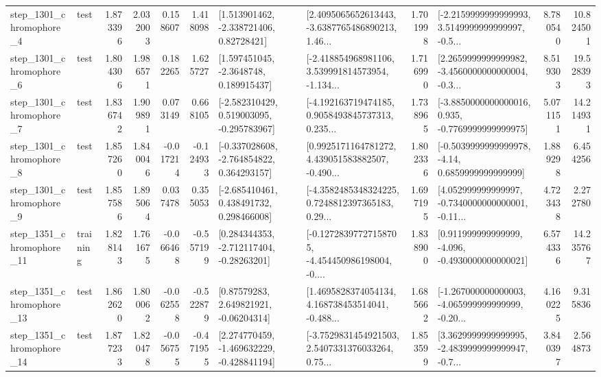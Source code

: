 \begin{tabular}{llrrrrllrlrr}
  step\_1301\_chromophore\_4 &      test &      1.873396 &    2.032003 &      0.158607 &  1.418098 &     [1.513901462, -2.338721406, 0.82728421] &  [2.4095065652613443, -3.6387765486890213, 1.46... &       1.701998 &  [-2.2159999999999993, 3.5149999999999997, -0.5... &            8.780540 &         10.824501 \\
  step\_1301\_chromophore\_6 &      test &      1.804306 &    1.986571 &      0.182265 &  1.625727 &      [1.597451045, -2.3648748, 0.189915437] &  [-2.418854968981106, 3.539991814573954, -1.134... &       1.716990 &  [2.2659999999999982, -3.4560000000000004, -0.3... &            8.519303 &         19.528393 \\
  step\_1301\_chromophore\_7 &      test &      1.836742 &    1.909891 &      0.073149 &  0.668105 &   [-2.582310429, 0.519003095, -0.295783967] &  [-4.192163719474185, 0.9058493845737313, 0.235... &       1.738965 &  [-3.8850000000000016, 0.935, -0.7769999999999975] &            5.071151 &         14.214931 \\
  step\_1301\_chromophore\_8 &      test &      1.857260 &    1.840046 &     -0.017214 & -0.124933 &   [-0.337028608, -2.764854822, 0.364293157] &  [0.9925171164781272, 4.439051583882507, -0.490... &       1.802336 &   [-0.5039999999999978, -4.14, 0.6859999999999999] &            1.889298 &          6.454256 \\
  step\_1301\_chromophore\_9 &      test &      1.857586 &    1.895064 &      0.037478 &  0.355053 &    [-2.685410461, 0.438491732, 0.298466008] &  [-4.3582485348324225, 0.7248812397365183, 0.29... &       1.697195 &  [4.052999999999997, -0.7340000000000001, -0.11... &            4.723438 &          2.272780 \\
 step\_1351\_chromophore\_11 &  training &      1.828143 &    1.761675 &     -0.066468 & -0.557199 &    [0.284344353, -2.712117404, -0.28263201] &  [-0.12728397727158705, -4.454450986198004, -0.... &       1.838900 &   [0.911999999999999, -4.096, -0.4930000000000021] &            6.574336 &         14.235767 \\
 step\_1351\_chromophore\_13 &      test &      1.862620 &    1.800062 &     -0.062558 & -0.522879 &      [0.87579283, 2.649821921, -0.06204314] &  [1.4695828374054134, 4.168738453514041, -0.488... &       1.685662 &  [-1.267000000000003, -4.065999999999999, -0.20... &            4.160225 &          9.315836 \\
 step\_1351\_chromophore\_14 &      test &      1.877233 &    1.820478 &     -0.056755 & -0.471955 &   [2.274770459, -1.469632229, -0.428841194] &  [-3.7529831454921503, 2.5407331376033264, 0.75... &       1.853599 &  [3.3629999999999995, -2.4839999999999947, -0.7... &            3.840397 &          2.564873 \\

\end{tabular}

